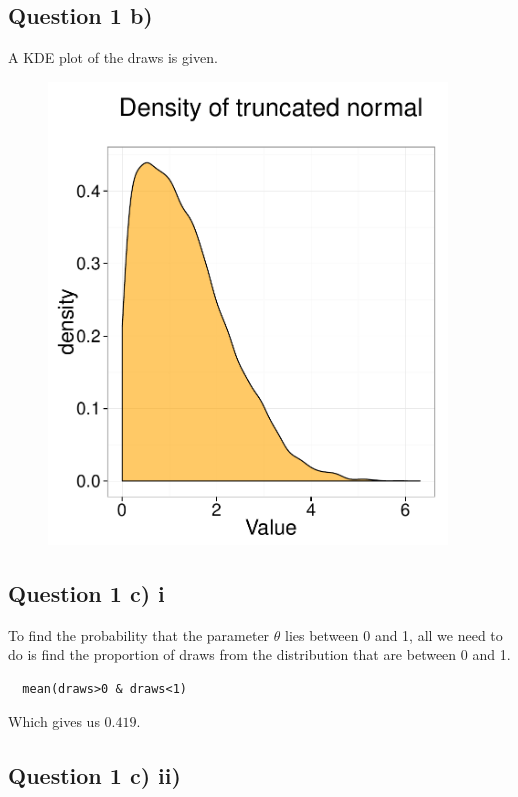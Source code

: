 \documentclass[a4paper,11pt]{article}
\begin{document}
\subsection*{Question 1 b)}

A KDE plot of the draws is given.

\begin{figure}
  \centering
  \includegraphics[width=300pt]{truncated_density.pdf}\\
  \label{density}
\end{figure}


\subsection*{Question 1 c) i}

To find the probability that the parameter $\theta$ lies between 0 and 1, all we need to do is find the proportion of draws from the distribution that are between 0 and 1.

\begin{verbatim}
  mean(draws>0 & draws<1)
\end{verbatim}

\noindent Which gives us $0.419$.

\subsection*{Question 1 c) ii)}
\end{document}
